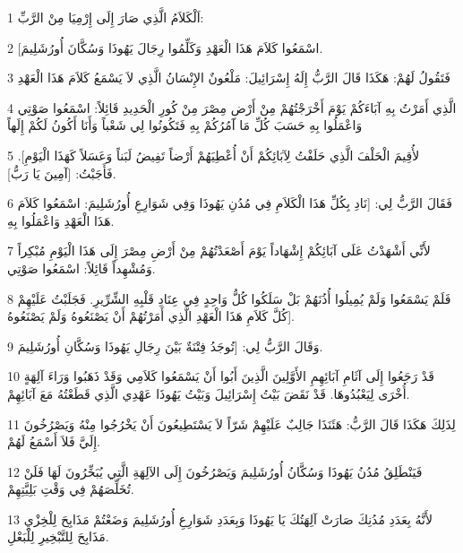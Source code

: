 \par 1 اَلْكَلاَمُ الَّذِي صَارَ إِلَى إِرْمِيَا مِنْ الرَّبِّ:
\par 2 [اسْمَعُوا كَلاَمَ هَذَا الْعَهْدِ وَكَلِّمُوا رِجَالَ يَهُوذَا وَسُكَّانَ أُورُشَلِيمَ.
\par 3 فَتَقُولُ لَهُمْ: هَكَذَا قَالَ الرَّبُّ إِلَهُ إِسْرَائِيلَ: مَلْعُونٌ الإِنْسَانُ الَّذِي لاَ يَسْمَعُ كَلاَمَ هَذَا الْعَهْدِ
\par 4 الَّذِي أَمَرْتُ بِهِ آبَاءَكُمْ يَوْمَ أَخْرَجْتُهُمْ مِنْ أَرْضِ مِصْرَ مِنْ كُورِ الْحَدِيدِ قَائِلاً: اسْمَعُوا صَوْتِي وَاعْمَلُوا بِهِ حَسَبَ كُلِّ مَا آمُرُكُمْ بِهِ فَتَكُونُوا لِي شَعْباً وَأَنَا أَكُونُ لَكُمْ إِلَهاً
\par 5 لأُقِيمَ الْحَلْفَ الَّذِي حَلَفْتُ لِآبَائِكُمْ أَنْ أُعْطِيَهُمْ أَرْضاً تَفِيضُ لَبَناً وَعَسَلاً كَهَذَا الْيَوْمِ]. فَأَجَبْتُ: [آمِينَ يَا رَبُّ].
\par 6 فَقَالَ الرَّبُّ لِي: [نَادِ بِكُلِّ هَذَا الْكَلاَمِ فِي مُدُنِ يَهُوذَا وَفِي شَوَارِعِ أُورُشَلِيمَ: اسْمَعُوا كَلاَمَ هَذَا الْعَهْدِ وَاعْمَلُوا بِهِ.
\par 7 لأَنِّي أَشْهَدْتُ عَلَى آبَائِكُمْ إِشْهَاداً يَوْمَ أَصْعَدْتُهُمْ مِنْ أَرْضِ مِصْرَ إِلَى هَذَا الْيَوْمِ مُبْكِراً وَمُشْهِداً قَائِلاً: اسْمَعُوا صَوْتِي.
\par 8 فَلَمْ يَسْمَعُوا وَلَمْ يُمِيلُوا أُذُنَهُمْ بَلْ سَلَكُوا كُلُّ وَاحِدٍ فِي عِنَادِ قَلْبِهِ الشِّرِّيرِ. فَجَلَبْتُ عَلَيْهِمْ كُلَّ كَلاَمِ هَذَا الْعَهْدِ الَّذِي أَمَرْتُهُمْ أَنْ يَصْنَعُوهُ وَلَمْ يَصْنَعُوهُ].
\par 9 وَقَالَ الرَّبُّ لِي: [تُوجَدُ فِتْنَةٌ بَيْنَ رِجَالِ يَهُوذَا وَسُكَّانِ أُورُشَلِيمَ.
\par 10 قَدْ رَجَعُوا إِلَى آثَامِ آبَائِهِمِ الأَوَّلِينَ الَّذِينَ أَبُوا أَنْ يَسْمَعُوا كَلاَمِي وَقَدْ ذَهَبُوا وَرَاءَ آلِهَةٍ أُخْرَى لِيَعْبُدُوهَا. قَدْ نَقَضَ بَيْتُ إِسْرَائِيلَ وَبَيْتُ يَهُوذَا عَهْدِي الَّذِي قَطَعْتُهُ مَعَ آبَائِهِمْ.
\par 11 لِذَلِكَ هَكَذَا قَالَ الرَّبُّ: هَئَنَذَا جَالِبٌ عَلَيْهِمْ شَرّاً لاَ يَسْتَطِيعُونَ أَنْ يَخْرُجُوا مِنْهُ وَيَصْرُخُونَ إِلَيَّ فَلاَ أَسْمَعُ لَهُمْ.
\par 12 فَيَنْطَلِقُ مُدُنُ يَهُوذَا وَسُكَّانُ أُورُشَلِيمَ وَيَصْرُخُونَ إِلَى الآلِهَةِ الَّتِي يُبَخِّرُونَ لَهَا فَلَنْ تُخَلِّصَهُمْ فِي وَقْتِ بَلِيَّتِهِمْ.
\par 13 لأَنَّهُ بِعَدَدِ مُدُنِكَ صَارَتْ آلِهَتُكَ يَا يَهُوذَا وَبِعَدَدِ شَوَارِعِ أُورُشَلِيمَ وَضَعْتُمْ مَذَابِحَ لِلْخِزْيِ مَذَابِحَ لِلتَّبْخِيرِ لِلْبَعْلِ.

